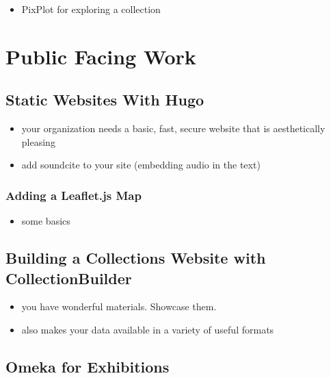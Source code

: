 \documentclass[
]{book}
\providecommand{\tightlist}{%
  \setlength{\itemsep}{0pt}\setlength{\parskip}{0pt}}
\begin{document}
\begin{itemize}
\tightlist
\item
  PixPlot for exploring a collection
\end{itemize}

\hypertarget{public-facing-work}{%
\chapter{Public Facing Work}\label{public-facing-work}}

\hypertarget{hugo}{%
\section{Static Websites With Hugo}\label{hugo}}

\begin{itemize}
\tightlist
\item
  your organization needs a basic, fast, secure website that is aesthetically pleasing
\item
  add soundcite to your site (embedding audio in the text)
\end{itemize}

\hypertarget{adding-a-leaflet.js-map}{%
\subsection{Adding a Leaflet.js Map}\label{adding-a-leaflet.js-map}}

\begin{itemize}
\tightlist
\item
  some basics
\end{itemize}

\hypertarget{collectionbuilder}{%
\section{Building a Collections Website with CollectionBuilder}\label{collectionbuilder}}

\begin{itemize}
\tightlist
\item
  you have wonderful materials. Showcase them.
\item
  also makes your data available in a variety of useful formats
\end{itemize}

\hypertarget{omeka}{%
\section{Omeka for Exhibitions}\label{omeka}}
\end{document}
